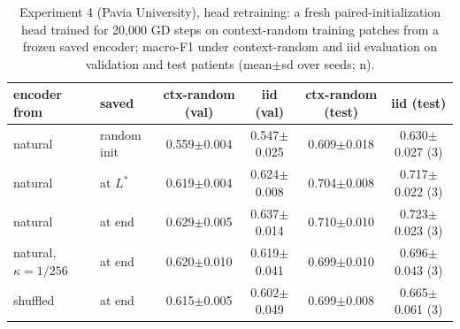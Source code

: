 \begin{table}[htbp]\centering\scriptsize
\caption{Experiment 4 (Pavia University), head retraining: a fresh paired-initialization head trained for 20{,}000 GD steps on context-random training patches from a frozen saved encoder; macro-F1 under context-random and iid evaluation on validation and test patients (mean$\pm$sd over seeds; n).}\label{tab:exp4_recovery_paviau}
\begin{tabular}{llcccc}\toprule
encoder from & saved & ctx-random (val) & iid (val) & ctx-random (test) & iid (test) \\ \midrule
natural & random init & 0.559$\pm$0.004 & 0.547$\pm$0.025 & 0.609$\pm$0.018 & 0.630$\pm$0.027 (3) \\
natural & at $L^\ast$ & 0.619$\pm$0.004 & 0.624$\pm$0.008 & 0.704$\pm$0.008 & 0.717$\pm$0.022 (3) \\
natural & at end & 0.629$\pm$0.005 & 0.637$\pm$0.014 & 0.710$\pm$0.010 & 0.723$\pm$0.023 (3) \\
natural, $\kappa=1/256$ & at end & 0.620$\pm$0.010 & 0.619$\pm$0.041 & 0.699$\pm$0.010 & 0.696$\pm$0.043 (3) \\
shuffled & at end & 0.615$\pm$0.005 & 0.602$\pm$0.049 & 0.699$\pm$0.008 & 0.665$\pm$0.061 (3) \\
\bottomrule\end{tabular}\end{table}
